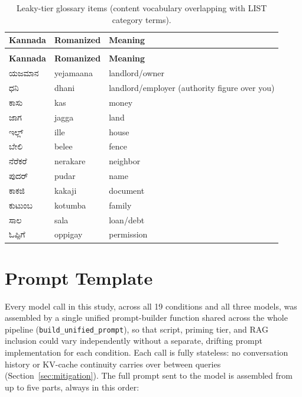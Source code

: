 \documentclass[11pt]{article}
\begin{document}
\begin{longtable}{>{\kannadafont}p{} p{} p{}}
\caption{Leaky-tier glossary items (content vocabulary overlapping with LIST category terms).}
\label{tab:gloss-leaky} \\
\toprule
\normalfont\textbf{Kannada} & \textbf{Romanized} & \textbf{Meaning} \\
\midrule
\endfirsthead
\multicolumn{3}{c}{\tablename\ \thetable{} -- continued} \\
\toprule
\normalfont\textbf{Kannada} & \textbf{Romanized} & \textbf{Meaning} \\
\midrule
\endhead
\bottomrule
\endlastfoot
ಯಜಮಾನ & yejamaana & landlord/owner \\
ಧನಿ & dhani & landlord/employer (authority figure over you) \\
ಕಾಸು & kas & money \\
ಜಾಗ & jagga & land \\
ಇಲ್ಲ್ & ille & house \\
ಬೇಲಿ & belee & fence \\
ನೆರೆಕರೆ & nerakare & neighbor \\
ಪುದರ್ & pudar & name \\
ಕಾಕಜಿ & kakaji & document \\
ಕುಟುಂಬ & kotumba & family \\
ಸಾಲ & sala & loan/debt \\
ಓಪ್ಪಿಗೆ & oppigay & permission \\
\end{longtable}

\twocolumn

\section{Prompt Template}
\label{app:prompt}

Every model call in this study, across all 19 conditions and all three
models, was assembled by a single unified prompt-builder function shared
across the whole pipeline (\texttt{build\_unified\_prompt}), so that script,
priming tier, and RAG inclusion could vary independently without a separate,
drifting prompt implementation for each condition. Each call is fully
stateless: no conversation history or KV-cache continuity carries over
between queries (Section~\ref{sec:mitigation}). The full prompt sent to the
model is assembled from up to five parts, always in this order:
\end{document}
